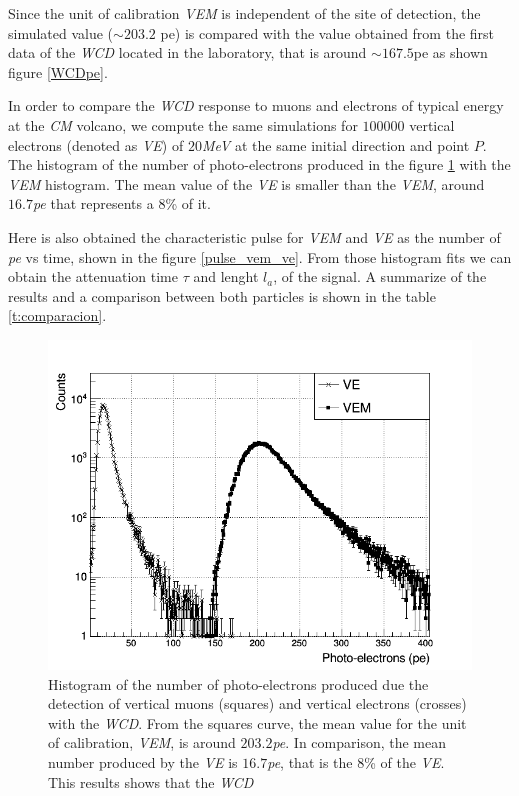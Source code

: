 \documentclass[submitting]{nst}
\begin{document}
Since the unit of calibration \textsl{VEM} is independent of the site of detection, the simulated value ($\sim 203.2$ pe) is compared with the value obtained from the first data of the \textsl{WCD} located in the laboratory, that is around $\sim 167.5$pe as shown figure \ref{WCDpe}. 

In order to compare the \textsl{WCD} response to muons and electrons of typical energy at the \textsl{CM} volcano, we compute the same simulations for $100000$ vertical electrons (denoted as \textsl{VE}) of $20$\textsl{MeV} at the same initial direction and point $P$. The histogram of the number of photo-electrons produced in the figure \ref{vem_ve} with the \textsl{VEM} histogram. The mean value of the \textsl{VE} is smaller than the \textsl{VEM}, around $16.7$\textsl{pe} that represents a $8$\% of it.

Here is also obtained the characteristic pulse for \textsl{VEM} and \textsl{VE} as the number of \textsl{pe} vs time, shown in the figure \ref{pulse_vem_ve}. From those histogram fits we can obtain the attenuation time $\tau$ and lenght $l_a$, of the signal. A summarize of the results and a comparison between both particles is shown in the table \ref{t:comparacion}.

\begin{figure}
    \centering
    \includegraphics[scale=0.38]{Figures/vem_ve.png}
    \caption{Histogram of the number of photo-electrons produced due the detection of vertical muons (squares) and vertical electrons (crosses) with the \textsl{WCD}. From the squares curve, the mean value for the unit of calibration, \textsl{VEM}, is around $203.2$\textsl{pe}. In comparison, the mean number produced by the \textsl{VE} is $16.7$\textsl{pe}, that is the $8$\% of the \textsl{VE}. This results shows that the \textsl{WCD} }
    \label{vem_ve}
\end{figure}
\end{document}
